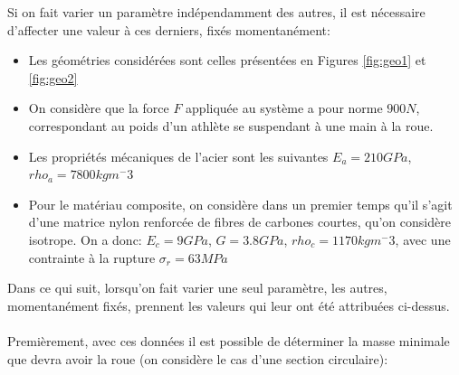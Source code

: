 Si on fait varier un paramètre indépendamment des autres, il est nécessaire d'affecter une valeur à ces derniers, fixés momentanément:
\begin{itemize}
	\item Les géométries considérées sont celles présentées en  Figures \ref{fig:geo1} et \ref{fig:geo2}
	\item On considère que la force $F$ appliquée au système a pour norme $900 N$, correspondant au poids d'un athlète se suspendant à une main à la roue.
	\item Les propriétés mécaniques de l'acier sont les suivantes $E_a=210GPa$, $rho_a=7800 kg m^-3$
	\item Pour le matériau composite, on considère dans un premier temps qu'il s'agit d'une matrice nylon renforcée de fibres de carbones courtes, qu'on considère isotrope. On a donc: $E_c=9 GPa$, $G=3.8 GPa$, $rho_c=1170 kg m^-3$, avec une contrainte à la rupture $\sigma_r=63 MPa$
\end{itemize}
Dans ce qui suit, lorsqu'on fait varier une seul paramètre, les autres, momentanément fixés, prennent les valeurs qui leur ont été attribuées ci-dessus.
\\
\\ 
Premièrement, avec ces données il est possible de déterminer la masse minimale que devra avoir la roue (on considère le cas d'une section circulaire):
